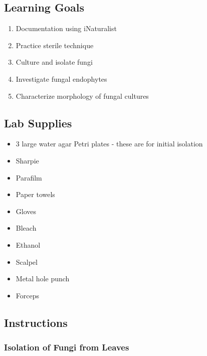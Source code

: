 \documentclass[
  letterpaper,
  DIV=11,
  numbers=noendperiod]{scrreprt}
\providecommand{\tightlist}{%
  \setlength{\itemsep}{0pt}\setlength{\parskip}{0pt}}
\begin{document}
\subsection*{Learning Goals}\label{learning-goals}

\begin{enumerate}
\def\labelenumi{\arabic{enumi}.}
\tightlist
\item
  Documentation using iNaturalist
\item
  Practice sterile technique
\item
  Culture and isolate fungi
\item
  Investigate fungal endophytes
\item
  Characterize morphology of fungal cultures
\end{enumerate}

\subsection*{Lab Supplies}\label{lab-supplies}

\begin{itemize}
\tightlist
\item[$\square$]
  3 large water agar Petri plates - these are for initial isolation
\item[$\square$]
  Sharpie
\item[$\square$]
  Parafilm
\item[$\square$]
  Paper towels
\item[$\square$]
  Gloves
\item[$\square$]
  Bleach
\item[$\square$]
  Ethanol
\item[$\square$]
  Scalpel
\item[$\square$]
  Metal hole punch
\item[$\square$]
  Forceps
\end{itemize}

\subsection*{Instructions}\label{instructions}

\subsubsection*{Isolation of Fungi from
Leaves}\label{isolation-of-fungi-from-leaves}
\end{document}
